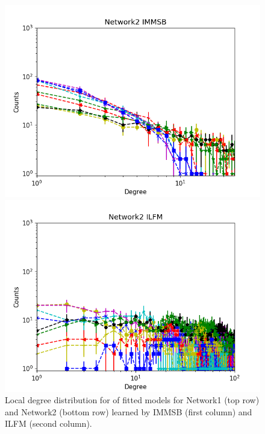 \begin{figure}[h]
\begin{minipage}{0.24\textwidth}
            \includegraphics[width=\textwidth]{img/corpus/immsb_network2_1}
        \end{minipage}
        \begin{minipage}{0.24\textwidth}
            \includegraphics[width=\textwidth]{img/corpus/ilfm_network2_1}
        \end{minipage}
        \caption {Local degree distribution for of fitted models for Network1 (top row) and Network2 (bottom row) learned by IMMSB (first column) and ILFM (second column).} 
	\label{fig:me_local}
\end{figure}

